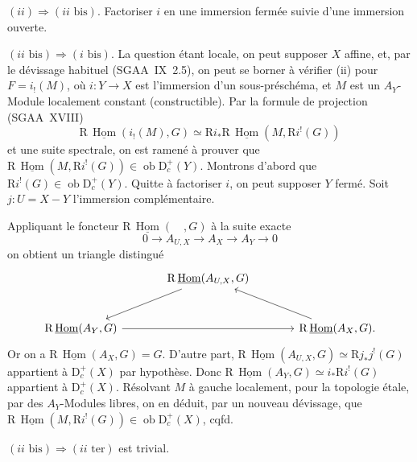 \documentclass[11pt]{article}
\DeclareMathOperator{\Hom}{Hom}
\newcommand{\R}{\mathrm{R}}\newcommand{\RHomCore}{\mathrm{RHom}}
\newcommand{\D}{\mathrm{D}}
\newcommand{\ob}{\operatorname{ob}}
\providecommand{\Hom}{\operatorname{Hom}}
\providecommand{\ob}{\operatorname{ob}}
\providecommand{\R}{\mathrm R}
\providecommand{\Hom}{\operatorname{Hom}}
\begin{document}
$(ii) \Rightarrow (ii\text{~bis})$. Factoriser $i$ en une immersion fermée suivie d'une immersion ouverte.

$(ii\text{~bis}) \Rightarrow (i\text{~bis})$. La question étant locale, on peut supposer $X$ affine, et, par le dévissage habituel (SGAA~IX~2.5), on peut se borner à vérifier (ii) pour $F = i_{!}(M)$, où $i : Y \to X$ est l'immersion d'un sous-préschéma, et $M$ est un $A_Y$-Module localement constant (constructible). Par la formule 
de
projection (SGAA~XVIII)
\[
\R\,\underline{\Hom}(i_{!}(M), G) \simeq \R i_{*} \R\,\underline{\Hom}(M, \R i^{!}(G))
\]
et une suite spectrale, on est ramené à prouver que $\R\,\underline{\Hom}(M, \R i^{!}(G)) \in \ob \D_c^{+}(Y)$. Montrons d'abord que $\R i^{!}(G) \in \ob \D_c^{+}(Y)$. Quitte à factoriser $i$, on peut supposer $Y$ fermé. Soit $j : U = X - Y$ l'immersion complémentaire.

Appliquant le foncteur $\R\,\underline{\Hom}(\quad, G)$ à la suite exacte
\[
0 \longrightarrow A_{U,X} \longrightarrow A_X \longrightarrow A_Y \longrightarrow 0
\]
on obtient un triangle distingué
\[
\begin{tikzcd}[column sep=large,row sep=large]
& \R\,\underline{\Hom}(A_{U,X}, G) \arrow[dl] & \\
\R\,\underline{\Hom}(A_Y, G) \arrow[rr] & & \R\,\underline{\Hom}(A_X, G). \arrow[ul]
\end{tikzcd}
\]
Or on a $\R\,\underline{\Hom}(A_X, G) = G$. D'autre part, $\R\,\underline{\Hom}(A_{U,X}, G) \simeq \R j_{*} j^{!}(G)$ appartient à $\D_c^{+}(X)$ par hypothèse. Donc $\R\,\underline{\Hom}(A_Y, G) \simeq i_{*} \R i^{!}(G)$ appartient à $\D_c^{+}(X)$. Résolvant $M$ à gauche localement, pour la topologie étale, par des $A_Y$-Modules libres, on en déduit, par un nouveau dévissage, que $\R\,\underline{\Hom}(M, \R i^{!}(G)) \in \ob \D_c^{+}(X)$, cqfd.

$(ii\text{~bis}) \Rightarrow (ii\text{~ter})$ est trivial.
\end{document}
